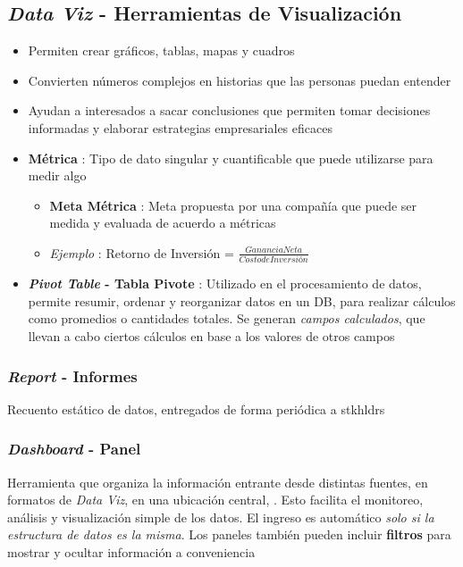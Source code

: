 \subsection{\textit{Data Viz} - Herramientas de Visualización}
\begin{itemize}
    \item {Permiten crear gráficos, tablas, mapas y cuadros}
    \item {Convierten números complejos en historias que las personas puedan entender}
    \item {Ayudan a interesados a sacar conclusiones que permiten tomar decisiones informadas y elaborar estrategias empresariales eficaces}
    \item {\textbf{Métrica} : Tipo de dato singular y cuantificable que puede utilizarse para medir algo
    \begin{itemize}
        \item {\textbf{Meta Métrica} : Meta propuesta por una compañía que puede ser medida y evaluada de acuerdo a métricas}
        \item {\textit{Ejemplo} : Retorno de Inversión = $\frac{Ganancia Neta}{Costo de Inversión}$}
    \end{itemize}}
    \item {\textbf{\textit{Pivot Table} - Tabla Pivote} : Utilizado en el procesamiento de datos, permite resumir, ordenar y reorganizar datos en un DB, para realizar cálculos como promedios o cantidades totales. Se generan \textit{campos calculados}, que llevan a cabo ciertos cálculos en base a los valores de otros campos}
\end{itemize}

\subsubsection{\textit{Report} - Informes}
Recuento estático de datos, entregados de forma periódica a \Gls{stkhldrs}

\subsubsection{\textit{Dashboard} - Panel}
Herramienta que organiza la información entrante desde distintas fuentes, en formatos de \textit{Data Viz}, en una ubicación central, . Esto facilita el monitoreo, análisis y visualización simple de los datos. El ingreso es automático \textit{solo si la estructura de datos es la misma}. Los paneles también pueden incluir \textbf{filtros} para mostrar y ocultar información a conveniencia
